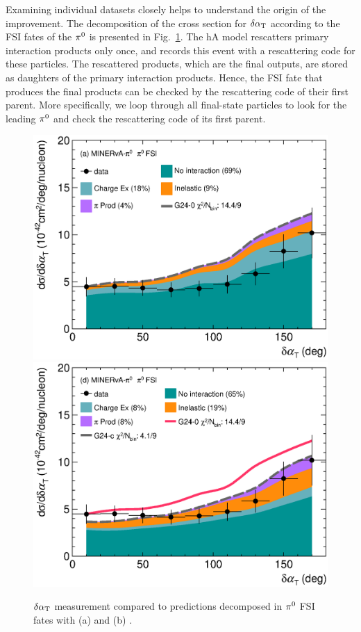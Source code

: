 Examining individual datasets closely helps to understand the origin of the improvement. The decomposition of the cross section for $\delta\alpha_\textrm{T}$ according to the FSI fates of the $\pi^0$ is presented in Fig.~\ref{fig:CEX-minpiz-dat-pi0}. The hA model rescatters primary interaction products only once, and records this event with a rescattering code for these particles. The rescattered products, which are the final outputs, are stored as daughters of the primary interaction products. Hence, the FSI fate that produces the final products can be checked by the rescattering code of their first parent. More specifically, we loop through all final-state particles to look for the leading $\pi^0$ and check the rescattering code of its first parent. 

\begin{figure}[!htb] 	
    \centering 		
    \includegraphics[width=\dbfigwid\textwidth]{figures/tuning/0000-min_pi0_dalphat_pi0_decomp_cex.eps}
    \includegraphics[width=\dbfigwid\textwidth]{figures/tuning/0026-min_pi0_dalphat_pi0_decomp_covfix.eps}	
    \caption{\label{fig:CEX-minpiz-dat-pi0} \minpiz $\delta\alpha_\textrm{T}$ measurement compared to \genie predictions decomposed in $\pi^0$ FSI fates with (a) \gZero and (b) \gC.} 
\end{figure}

